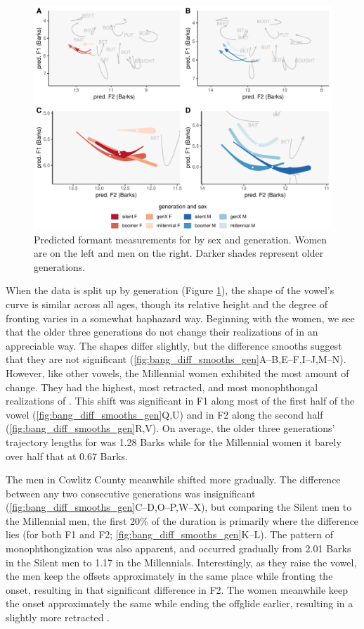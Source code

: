 \begin{figure}[tb!]
	\centering
	\includegraphics[width = 6.5in]{Figures/BANG/BANG_four_panel_plot.pdf}
	\caption[Predicted formant measurements for \bang by sex and generation.]{Predicted formant measurements for \bang by sex and generation. Women are on the left and men on the right. Darker shades represent older generations.}
	\label{fig:BANG_four_panel}
\end{figure}

When the data is split up by generation (Figure \ref{fig:BANG_four_panel}), the shape of the vowel's curve is similar across all ages, though its relative height and the degree of fronting varies in a somewhat haphazard way. Beginning with the women, we see that the older three generations do not change their realizations of \bang in an appreciable way. The shapes differ slightly, but the difference smooths suggest that they are not significant (\ref{fig:bang_diff_smooths_gen}A--B,E--F,I--J,M--N). However, like other vowels, the Millennial women exhibited the most amount of change. They had the highest, most retracted, and most monophthongal realizations of \bang. This shift was significant in F1 along most of the first half of the vowel (\ref{fig:bang_diff_smooths_gen}Q,U) and in F2 along the second half (\ref{fig:bang_diff_smooths_gen}R,V). On average, the older three generations' trajectory lengths for \bang was 1.28 Barks while for the Millennial women it barely over half that at 0.67 Barks.

The men in Cowlitz County meanwhile shifted \bang more gradually. The difference between any two consecutive generations was insignificant (\ref{fig:bang_diff_smooths_gen}C--D,O--P,W--X), but comparing the Silent men to the Millennial men, the first 20\% of the duration is primarily where the difference lies (for both F1 and F2; \ref{fig:bang_diff_smooths_gen}K--L). The pattern of monophthongization was also apparent, and occurred gradually from 2.01 Barks in the Silent men to 1.17 in the Millennials. Interestingly, as they raise the vowel, the men keep the offsets approximately in the same place while fronting the onset, resulting in that significant difference in F2. The women meanwhile keep the onset approximately the same while ending the offglide earlier, resulting in a slightly more retracted \bang.

